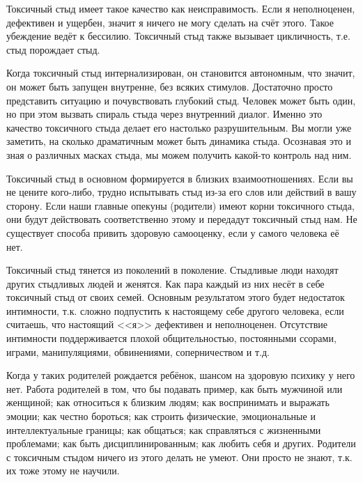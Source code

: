\documentclass[10pt, fleqn]{article}
\begin{document}

Токсичный стыд имеет такое качество как неисправимость. Если я неполноценен, дефективен и ущербен, значит я ничего не могу сделать на счёт этого. Такое убеждение ведёт к бессилию.
Токсичный стыд также вызывает цикличность, т.е. стыд порождает стыд.


Когда токсичный стыд интернализирован, он становится автономным, что значит, он может быть запущен внутренне, без всяких стимулов. Достаточно просто представить ситуацию и почувствовать глубокий стыд. Человек может быть один, но при этом вызвать спираль стыда через внутренний диалог.
Именно это качество токсичного стыда делает его настолько разрушительным.
Вы могли уже заметить, на сколько драматичным может быть динамика стыда. Осознавая это и зная о различных масках стыда, мы можем получить какой-то контроль над ним.


Токсичный стыд в основном формируется в близких взаимоотношениях. Если вы не цените кого-либо, трудно испытывать стыд из-за его слов или действий в вашу сторону.
Если наши главные опекуны (родители) имеют корни токсичного стыда, они будут действовать соответственно этому и передадут токсичный стыд нам. Не существует способа привить здоровую самооценку, если у самого человека её нет.

Токсичный стыд тянется из поколений в поколение. Стыдливые люди находят других стыдливых людей и женятся. Как пара каждый из них несёт в себе токсичный стыд от своих семей. Основным результатом этого будет недостаток интимности, т.к. сложно подпустить к настоящему себе другого человека, если считаешь, что настоящий <<я>> дефективен и неполноценен. Отсутствие интимности поддерживается плохой общительностью, постоянными ссорами, играми, манипуляциями, обвинениями, соперничеством и т.д.

Когда у таких родителей рождается ребёнок, шансом на здоровую психику у него нет. Работа родителей в том, что бы подавать пример, как быть мужчиной или женщиной; как относиться к близким людям; как воспринимать и выражать эмоции; как честно бороться; как строить физические, эмоциональные и интеллектуальные границы; как общаться; как справляться с жизненными проблемами; как быть дисциплинированным; как любить себя и других. Родители с токсичным стыдом ничего из этого делать не умеют. Они просто не знают, т.к. их тоже этому не научили.
\end{document}

